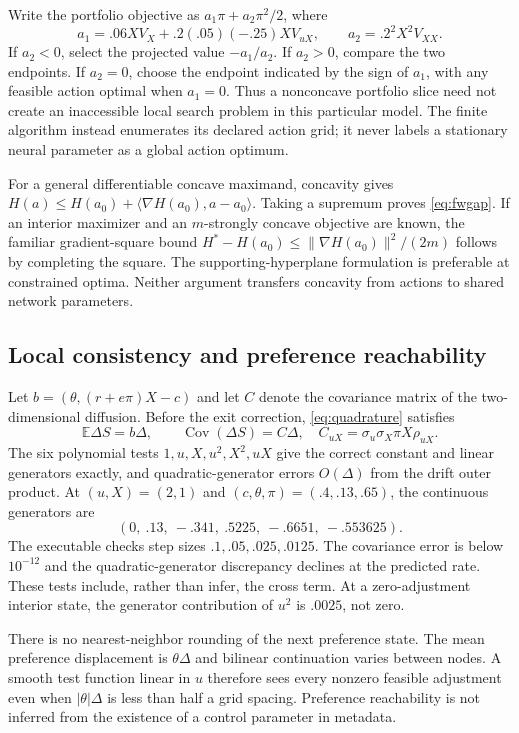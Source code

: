 Write the portfolio objective as $a_1\pi+a_2\pi^2/2$, where
\[
a_1=.06XV_X+.2(.05)(-.25)XV_{uX},\qquad a_2=.2^2X^2V_{XX}.
\]
If $a_2<0$, select the projected value $-a_1/a_2$. If $a_2>0$, compare the two endpoints. If $a_2=0$, choose the endpoint indicated by the sign of $a_1$, with any feasible action optimal when $a_1=0$. Thus a nonconcave portfolio slice need not create an inaccessible local search problem in this particular model. The finite algorithm instead enumerates its declared action grid; it never labels a stationary neural parameter as a global action optimum.

For a general differentiable concave maximand, concavity gives
$H(a)\leq H(a_0)+\langle\nabla H(a_0),a-a_0\rangle$. Taking a supremum proves \eqref{eq:fwgap}. If an interior maximizer and an $m$-strongly concave objective are known, the familiar gradient-square bound $H^*-H(a_0)\leq\|\nabla H(a_0)\|^2/(2m)$ follows by completing the square. The supporting-hyperplane formulation is preferable at constrained optima. Neither argument transfers concavity from actions to shared network parameters.

\subsection{Local consistency and preference reachability}
Let $b=(\theta,(r+e\pi)X-c)$ and let $C$ denote the covariance matrix of the two-dimensional diffusion. Before the exit correction, \eqref{eq:quadrature} satisfies
\[
\mathbb E\Delta S=b\Delta,\qquad
\operatorname{Cov}(\Delta S)=C\Delta,
\quad C_{uX}=\sigma_u\sigma_X\pi X\rho_{uX}.
\]
The six polynomial tests $1,u,X,u^2,X^2,uX$ give the correct constant and linear generators exactly, and quadratic-generator errors $O(\Delta)$ from the drift outer product. At $(u,X)=(2,1)$ and $(c,\theta,\pi)=(.4,.13,.65)$, the continuous generators are
\[
(0,\ .13,\ -.341,\ .5225,\ -.6651,\ -.553625).
\]
The executable checks step sizes $.1,.05,.025,.0125$. The covariance error is below $10^{-12}$ and the quadratic-generator discrepancy declines at the predicted rate. These tests include, rather than infer, the cross term. At a zero-adjustment interior state, the generator contribution of $u^2$ is $.0025$, not zero.

There is no nearest-neighbor rounding of the next preference state. The mean preference displacement is $\theta\Delta$ and bilinear continuation varies between nodes. A smooth test function linear in $u$ therefore sees every nonzero feasible adjustment even when $|\theta|\Delta$ is less than half a grid spacing. Preference reachability is not inferred from the existence of a control parameter in metadata.

